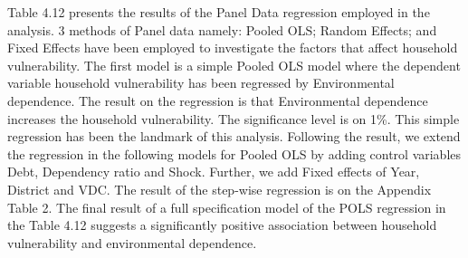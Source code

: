 Table 4.12 presents the results of the Panel Data regression employed in the analysis. 3 methods of Panel data namely: Pooled OLS; Random Effects; and Fixed Effects have been employed to investigate the factors that affect household vulnerability. The first model is a simple Pooled OLS model where the dependent variable household vulnerability has been regressed by Environmental dependence. The result on the regression is that Environmental dependence increases the household vulnerability. The significance level is on 1\%. This simple regression has been the landmark of this analysis. Following the result, we extend the regression in the following models for Pooled OLS by adding control variables Debt, Dependency ratio and Shock. Further, we add Fixed effects of Year, District and VDC. The result of the step-wise regression is on the Appendix Table 2. The final result of a full specification model of the POLS regression in the Table 4.12 suggests a significantly positive association between household vulnerability and environmental dependence.

